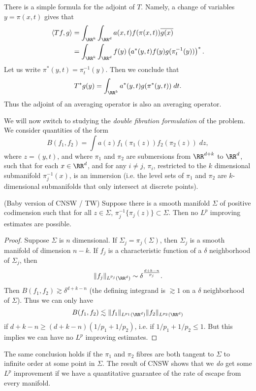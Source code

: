 There is a simple formula for the adjoint of $T$. Namely, a change of variables $y = \pi(x,t)$ gives that
%
\begin{align*}
    \langle Tf, g \rangle &= \int_{\RR^k} \int_{\RR^d} a(x,t) f(\pi(x,t)) \overline{g(x)}\\
    &= \int_{\RR^k} \int_{\RR^d} f(y) \left( a^*(y,t) f(y) g(\pi_t^{-1}(y)) \right)^*.
\end{align*}
%
Let us write $\pi^*(y,t) = \pi_t^{-1}(y)$. Then we conclude that
%
\[ T^* g(y) = \int_{\RR^k} a^*(y,t) g(\pi^*(y,t))\; dt. \]
%
Thus the adjoint of an averaging operator is also an averaging operator.

We will now switch to studying the \emph{double fibration formulation} of the problem. We consider quantities of the form
%
\[ B(f_1,f_2) = \int a(z) f_1(\pi_1(z)) f_2(\pi_2(z))\; dz, \]
%
where $z = (y,t)$, and where $\pi_1$ and $\pi_2$ are submersions from $\RR^{d+k}$ to $\RR^d$, such that for each $x \in \RR^d$, and for any $i \neq j$, $\pi_i$, restricted to the $k$ dimensional submanifold $\pi_j^{-1}(x)$, is an immersion (i.e. the level sets of $\pi_1$ and $\pi_2$ are $k$-dimensional submanifolds that only intersect at discrete points).

\begin{theorem} (Baby version of CNSW / TW)
    Suppose there is a smooth manifold $\Sigma$ of positive codimension such that for all $z \in \Sigma$, $\pi_j^{-1} \{ \pi_j(z) \} \subset \Sigma$. Then no $L^p$ improving estimates are possible.
\end{theorem}
\begin{proof}
    Suppose $\Sigma$ is $n$ dimensional. If $\Sigma_j = \pi_j(\Sigma)$, then $\Sigma_j$ is a smooth manifold of dimension $n-k$. If $f_j$ is a characteristic function of a $\delta$ neighborhood of $\Sigma_j$, then
    \[ \| f_j \|_{L^{p_j}(\RR^d)} \sim \delta^{\frac{d+k-n}{p_j}}. \]
    Then $B(f_1,f_2) \gtrsim \delta^{d+k-n}$ (the defining integrand is $\gtrsim 1$ on a $\delta$ neighborhood of $\Sigma$). Thus we can only have
    \[ B(f_1,f_2) \lesssim \| f_1 \|_{L^{p_1}(\RR^d)} \| f_2 \|_{L^{p_2}(\RR^d)} \]
    if $d + k - n \geq (d+k-n)(1/p_1 + 1/p_2)$, i.e. if $1/p_1 + 1/p_2 \leq 1$. But this implies we can have no $L^p$ improving estimates.
\end{proof}

The same conclusion holds if the $\pi_1$ and $\pi_2$ fibres are both tangent to $\Sigma$ to infinite order at some point in $\Sigma$. The result of CNSW shows that we \emph{do} get some $L^p$ improvement if we have a quantitative guarantee of the rate of escape from every manifold.

